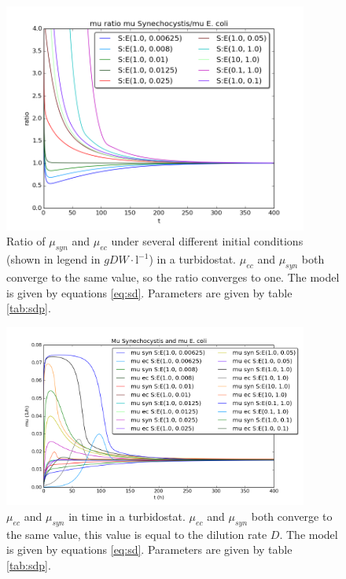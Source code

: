 \documentclass[10pt]{report}
\begin{document}
\begin{figure}[!ht]
 \begin{center}  
     \includegraphics[width=10cm]{sub_dependent_turbidostat_muratio.png}
     \caption{Ratio of $\mu_{syn}$ and $\mu_{ec}$ under several different initial conditions (shown in legend in $gDW\cdot \text{l}^{-1}$) in a turbidostat. $\mu_{ec}$ and $\mu_{syn}$ both converge to the same value, so the ratio converges to one. The model is given by equations \ref{eq:sd}. Parameters are given by table \ref{tab:sdp}.}
    \label{fig:submratturb}
    \end{center}
\end{figure}

\begin{figure}[!ht] 
 \begin{center}  
     \includegraphics[width=10cm]{sub_dependent_turbidostat_mus.png}
     \caption{$\mu_{ec}$ and $\mu_{syn}$ in time in a turbidostat. $\mu_{ec}$ and $\mu_{syn}$ both converge to the same value, this value is equal to the dilution rate $D$. The model is given by equations \ref{eq:sd}. Parameters are given by table \ref{tab:sdp}.}
    \label{fig:submusratturb}
    \end{center}
\end{figure}
\end{document}
